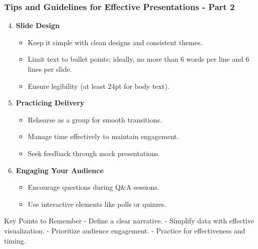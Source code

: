 \documentclass[aspectratio=169]{beamer}
\begin{document}
\begin{frame}[fragile]
    \frametitle{Tips and Guidelines for Effective Presentations - Part 2}
    \begin{enumerate}
        \setcounter{enumi}{3}
        \item \textbf{Slide Design}
            \begin{itemize}
                \item Keep it simple with clean designs and consistent themes.
                \item Limit text to bullet points; ideally, no more than 6 words per line and 6 lines per slide.
                \item Ensure legibility (at least 24pt for body text).
            \end{itemize}

        \item \textbf{Practicing Delivery}
            \begin{itemize}
                \item Rehearse as a group for smooth transitions.
                \item Manage time effectively to maintain engagement.
                \item Seek feedback through mock presentations.
            \end{itemize}

        \item \textbf{Engaging Your Audience}
            \begin{itemize}
                \item Encourage questions during Q\&A sessions.
                \item Use interactive elements like polls or quizzes.
            \end{itemize}
    \end{enumerate}
    
    \begin{block}{Key Points to Remember}
        - Define a clear narrative.
        - Simplify data with effective visualization.
        - Prioritize audience engagement.
        - Practice for effectiveness and timing.
    \end{block}
\end{frame}
\end{document}

